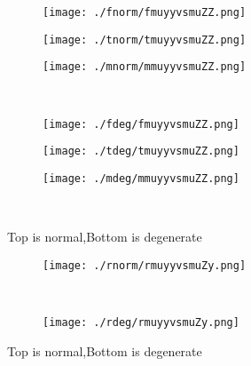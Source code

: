 \documentclass[aps,floats,floatfix,nofootinbib]{revtex4-1}
\begin{document}
\begin{center}
\begin{figure}
\begin{subfigure}{0.3\textwidth}
\texttt{[image: ./fnorm/fmuyyvsmuZZ.png]}
\label{}
\end{subfigure}
\begin{subfigure}{0.3\textwidth}
\texttt{[image: ./tnorm/tmuyyvsmuZZ.png]}
\label{}
\end{subfigure}
\begin{subfigure}{0.3\textwidth}
\texttt{[image: ./mnorm/mmuyyvsmuZZ.png]}
\label{}
\end{subfigure}\\
\begin{subfigure}{0.3\textwidth}
\texttt{[image: ./fdeg/fmuyyvsmuZZ.png]}
\label{}
\end{subfigure}
\begin{subfigure}{0.3\textwidth}
\texttt{[image: ./tdeg/tmuyyvsmuZZ.png]}
\label{}
\end{subfigure}
\begin{subfigure}{0.3\textwidth}
\texttt{[image: ./mdeg/mmuyyvsmuZZ.png]}
\label{}
\end{subfigure}\\
\caption{Top is normal,Bottom is degenerate}
\end{figure}
\end{center}

\begin{center}
\begin{figure}
\begin{subfigure}{1.0\textwidth}
\texttt{[image: ./rnorm/rmuyyvsmuZy.png]}
\label{}
\end{subfigure}\\
\begin{subfigure}{1.0\textwidth}
\texttt{[image: ./rdeg/rmuyyvsmuZy.png]}
\label{}
\end{subfigure}
\caption{Top is normal,Bottom is degenerate}
\end{figure}
\end{center}
\end{document}
